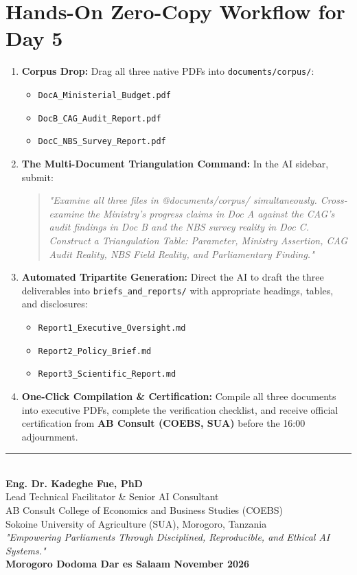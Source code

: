 \documentclass[11pt, a4paper]{report}
\begin{document}
\section{Hands-On Zero-Copy Workflow for Day 5}
\begin{enumerate}[label=\textbf{Step \arabic*:}]
    \item \textbf{Corpus Drop:} Drag all three native PDFs into \texttt{documents/corpus/}:
    \begin{itemize}[label=-]
        \item \texttt{DocA\_Ministerial\_Budget.pdf}
        \item \texttt{DocB\_CAG\_Audit\_Report.pdf}
        \item \texttt{DocC\_NBS\_Survey\_Report.pdf}
    \end{itemize}
    \item \textbf{The Multi-Document Triangulation Command:} In the AI sidebar, submit:
    \begin{quote}
        \small\textit{"Examine all three files in @documents/corpus/ simultaneously. Cross-examine the Ministry's progress claims in Doc A against the CAG's audit findings in Doc B and the NBS survey reality in Doc C. Construct a Triangulation Table: Parameter, Ministry Assertion, CAG Audit Reality, NBS Field Reality, and Parliamentary Finding."}
    \end{quote}
    \item \textbf{Automated Tripartite Generation:} Direct the AI to draft the three deliverables into \texttt{briefs\_and\_reports/} with appropriate headings, tables, and disclosures:
    \begin{itemize}[label=-]
        \item \texttt{Report1\_Executive\_Oversight.md}
        \item \texttt{Report2\_Policy\_Brief.md}
        \item \texttt{Report3\_Scientific\_Report.md}
    \end{itemize}
    \item \textbf{One-Click Compilation \& Certification:} Compile all three documents into executive PDFs, complete the verification checklist, and receive official certification from \textcolor{tanzaniablue}{\textbf{AB Consult (COEBS, SUA)}} before the 16:00 adjournment.
\end{enumerate}

\vspace{1.5cm}
\begin{center}
    \rule{0.65\textwidth}{0.4pt}\\[0.3cm]
    \textbf{\Large Eng. Dr. Kadeghe Fue, PhD}\\
    Lead Technical Facilitator \& Senior AI Consultant\\
    AB Consult \textbullet{} College of Economics and Business Studies (COEBS)\\
    Sokoine University of Agriculture (SUA), Morogoro, Tanzania\\[0.3cm]
    \small\textit{"Empowering Parliaments Through Disciplined, Reproducible, and Ethical AI Systems."}\\[0.5cm]
    \textbf{Morogoro \textbullet{} Dodoma \textbullet{} Dar es Salaam \textbullet{} November 2026}
\end{center}
\end{document}
